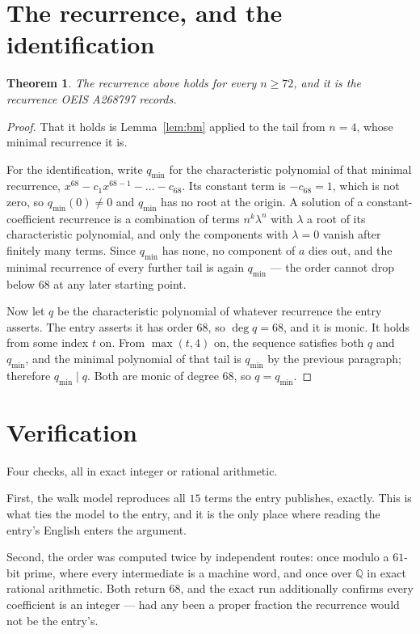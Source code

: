 \documentclass[11pt,a4paper]{article}
\theoremstyle{plain}
\newtheorem{theorem}{Theorem}
\theoremstyle{definition}
\begin{document}
\section{The recurrence, and the identification}

\begin{theorem}
The recurrence above holds for every $n\ge72$, and it is the recurrence OEIS A268797 records.
\end{theorem}

\begin{proof}
That it holds is Lemma~\ref{lem:bm} applied to the tail from $n=4$, whose minimal
recurrence it is.

For the identification, write $q_{\min}$ for the characteristic polynomial of that minimal
recurrence, $x^{68}-c_1x^{68-1}-\dots-c_{68}$. Its constant term is
$-c_{68}=1$, which is not zero, so $q_{\min}(0)\neq0$ and $q_{\min}$ has no
root at the origin. A solution of a constant-coefficient recurrence is a combination of terms
$n^{k}\lambda^{n}$ with $\lambda$ a root of its characteristic polynomial, and only the
components with $\lambda=0$ vanish after finitely many terms. Since $q_{\min}$ has none, no
component of $a$ dies out, and the minimal recurrence of every further tail is again
$q_{\min}$ --- the order cannot drop below $68$ at any later starting point.

Now let $q$ be the characteristic polynomial of whatever recurrence the entry asserts. The
entry asserts it has order $68$, so $\deg q=68$, and it is monic. It holds from some
index $t$ on. From $\max(t,4)$ on, the sequence satisfies both $q$ and $q_{\min}$, and
the minimal polynomial of that tail is $q_{\min}$ by the previous paragraph; therefore
$q_{\min}\mid q$. Both are monic of degree $68$, so $q=q_{\min}$.
\end{proof}

\section{Verification}

Four checks, all in exact integer or rational arithmetic.

First, the walk model reproduces all $15$ terms the entry publishes, exactly. This is
what ties the model to the entry, and it is the only place where reading the entry's English
enters the argument.

Second, the order was computed twice by independent routes: once modulo a $61$-bit prime, where
every intermediate is a machine word, and once over $\mathbb{Q}$ in exact rational arithmetic.
Both return $68$, and the exact run additionally confirms every coefficient is an integer
--- had any been a proper fraction the recurrence would not be the entry's.
\end{document}
